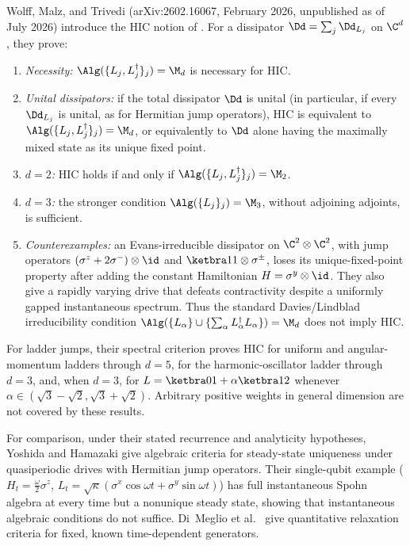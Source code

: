 \documentclass[class=article,11pt,a4paper,crop=false]{standalone}
\begin{document}
Wolff, Malz, and Trivedi \cite{Wolff2026Contractivity}
(arXiv:2602.16067, February 2026, unpublished as of July 2026) introduce the
HIC notion of
.
For a dissipator $\Dd=\sum_j\Dd_{L_j}$ on $\C^d$, they prove:
\begin{enumerate}[label=(\alph*)]
	\item \emph{Necessity:} $\Alg(\{L_j,L_j^\dagger\}_j)=\M_d$ is necessary for
	      HIC.
	\item \emph{Unital dissipators:} if the total dissipator $\Dd$ is unital
	      (in particular, if every $\Dd_{L_j}$ is unital, as for Hermitian
	      jump operators), HIC is equivalent to
	      $\Alg(\{L_j,L_j^\dagger\}_j)=\M_d$, or equivalently to $\Dd$ alone having
	      the maximally mixed state as its unique fixed point.
	\item \emph{$d=2$:} HIC holds if and only if
	      $\Alg(\{L_j,L_j^\dagger\}_j)=\M_2$.
	\item \emph{$d=3$:} the stronger condition $\Alg(\{L_j\}_j)=\M_3$, without
	      adjoining adjoints, is sufficient.
	\item \emph{Counterexamples:} an Evans-irreducible dissipator on
	      $\C^2\otimes\C^2$, with jump operators
	      $(\sigma^z+2\sigma^-)\otimes\id$ and
	      $\ketbra11\otimes\sigma^\pm$, loses its unique-fixed-point property after
	      adding the constant Hamiltonian $H=\sigma^y\otimes\id$. They also give a
	      rapidly varying drive that defeats contractivity despite a uniformly
	      gapped instantaneous spectrum. Thus the standard Davies/Lindblad
	      irreducibility condition
	      $\Alg(\{L_\alpha\}\cup\{\sum_\alpha L_\alpha^\dagger L_\alpha\})=\M_d$
	      does not imply HIC.
\end{enumerate}
For ladder jumps, their spectral criterion proves HIC for uniform and
angular-momentum ladders through $d=5$, for the harmonic-oscillator ladder
through $d=3$, and, when $d=3$, for
$L=\ketbra01+\alpha\ketbra12$ whenever
$\alpha\in(\sqrt3-\sqrt2,\sqrt3+\sqrt2)$. Arbitrary positive weights in
general dimension are not covered by these results.

For comparison, under their stated recurrence and analyticity hypotheses,
Yoshida and Hamazaki \cite{Yoshida2026Steady} give algebraic criteria for
steady-state uniqueness under quasiperiodic drives with Hermitian jump
operators. Their single-qubit example
($H_t=\tfrac\omega2\sigma^z$,
$L_t=\sqrt\kappa(\sigma^x\cos\omega t+\sigma^y\sin\omega t)$) has full
instantaneous Spohn algebra at every time but a nonunique steady state, showing
that instantaneous algebraic conditions do not suffice. Di~Meglio et al.\
\cite{DiMeglio2024Relaxation} give quantitative relaxation criteria for fixed,
known time-dependent generators.
\end{document}
